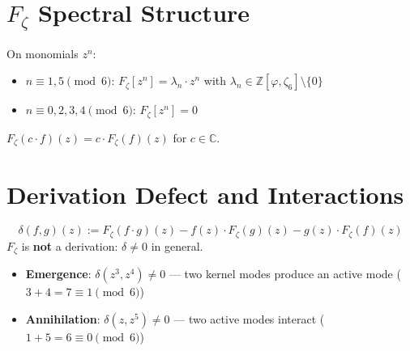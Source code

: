 \section{\texorpdfstring{$F_\zeta$}{Fζ} Spectral Structure}
\label{sec:Fzeta_spectral}

\begin{theorem}
\label{thm:Fzeta_eigenvalues}
\leanok
On monomials $z^n$:
\begin{itemize}
\item $n \equiv 1, 5 \pmod{6}$: $F_\zeta[z^n] = \lambda_n \cdot z^n$ with $\lambda_n \in \mathbb{Z}[\varphi, \zeta_6] \setminus \{0\}$
\item $n \equiv 0, 2, 3, 4 \pmod{6}$: $F_\zeta[z^n] = 0$
\end{itemize}
\end{theorem}

\begin{theorem}
\label{thm:Fzeta_linearity}
\leanok
$F_\zeta(c \cdot f)(z) = c \cdot F_\zeta(f)(z)$ for $c \in \mathbb{C}$.
\end{theorem}

\section{Derivation Defect and Interactions}
\label{sec:deriv_defect}

\begin{definition}
\label{def:deriv_defect}
\[
\delta(f, g)(z) := F_\zeta(f \cdot g)(z) - f(z) \cdot F_\zeta(g)(z) - g(z) \cdot F_\zeta(f)(z)
\]
$F_\zeta$ is \textbf{not} a derivation: $\delta \neq 0$ in general.
\end{definition}

\begin{theorem}
\label{thm:emergence_annihilation}
\leanok
\begin{itemize}
\item \textbf{Emergence}: $\delta(z^3, z^4) \neq 0$ --- two kernel modes produce an active mode ($3 + 4 = 7 \equiv 1 \pmod{6}$)
\item \textbf{Annihilation}: $\delta(z, z^5) \neq 0$ --- two active modes interact ($1 + 5 = 6 \equiv 0 \pmod{6}$)
\end{itemize}
\end{theorem}

